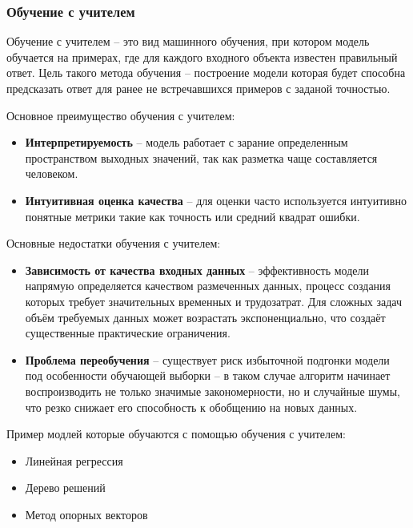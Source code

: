 \documentclass[../part_1.tex]{subfiles}
\begin{document}
\subsubsection{Обучение с учителем} %
    \label{sec:with_teacher}
    \par Обучение с учителем -- это вид машинного обучения, при котором модель обучается на примерах, где для каждого входного объекта известен правильный ответ. Цель такого метода обучения -- построение модели которая будет способна предсказать ответ для ранее не встречавшихся примеров с заданой точностью.
    \par Основное преимущество обучения с учителем:
    \begin{itemize}
        \item \textbf{Интерпретируемость} -- модель работает с зарание определенным пространством выходных значений, так как разметка чаще составляется человеком.
        \item \textbf{Интуитивная оценка качества} -- для оценки часто используется интуитивно понятные метрики такие как точность или средний квадрат ошибки. 
    \end{itemize}
    \par Основные недостатки обучения с учителем:
    \begin{itemize}
        \item \textbf{Зависимость от качества входных данных} -- эффективность модели напрямую определяется качеством размеченных данных, процесс создания которых требует значительных временных и трудозатрат. Для сложных задач объём требуемых данных может возрастать экспоненциально, что создаёт существенные практические ограничения.
        \item \textbf{Проблема переобучения} -- существует риск избыточной подгонки модели под особенности обучающей выборки -- в таком случае алгоритм начинает воспроизводить не только значимые закономерности, но и случайные шумы, что резко снижает его способность к обобщению на новых данных.
    \end{itemize}
    \par Пример модлей которые обучаются с помощью обучения с учителем:
    \begin{itemize}
        \item Линейная регрессия
        \item Дерево решений
        \item Метод опорных векторов
    \end{itemize}
    
\end{document}

